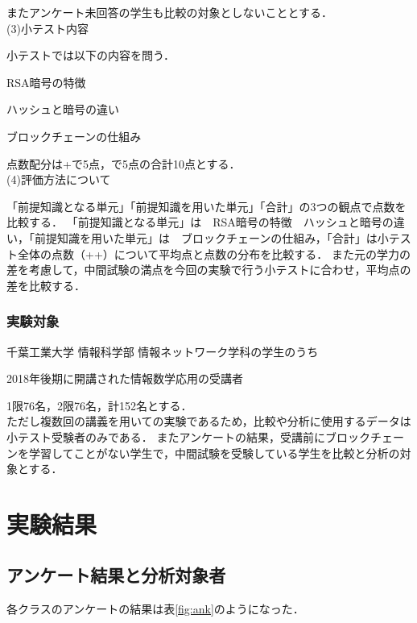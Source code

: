 \documentclass[a4j,12pt]{jsarticle}
\begin{document}
またアンケート未回答の学生も比較の対象としないこととする．
\\


(3)小テスト内容

小テストでは以下の内容を問う．

RSA暗号の特徴

ハッシュと暗号の違い

ブロックチェーンの仕組み

点数配分は+で5点，で5点の合計10点とする．\\


(4)評価方法について

「前提知識となる単元」「前提知識を用いた単元」「合計」の3つの観点で点数を比較する．
「前提知識となる単元」は　RSA暗号の特徴　ハッシュと暗号の違い，「前提知識を用いた単元」は　ブロックチェーンの仕組み，「合計」は小テスト全体の点数（++）について平均点と点数の分布を比較する．
また元の学力の差を考慮して，中間試験の満点を今回の実験で行う小テストに合わせ，平均点の差を比較する．

\subsubsection{実験対象}

千葉工業大学 情報科学部 情報ネットワーク学科の学生のうち

2018年後期に開講された情報数学応用の受講者

1限76名，2限76名，計152名とする．\\

ただし複数回の講義を用いての実験であるため，比較や分析に使用するデータは小テスト受験者のみである．
またアンケートの結果，受講前にブロックチェーンを学習してことがない学生で，中間試験を受験している学生を比較と分析の対象とする．





\newpage
\section{実験結果}
\subsection{アンケート結果と分析対象者}
各クラスのアンケートの結果は表\ref{fig:ank}のようになった．\\
\end{document}
